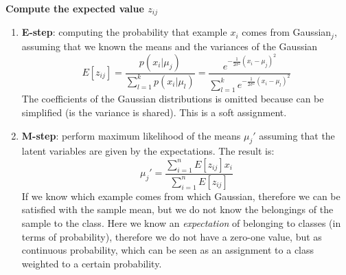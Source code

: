 \textbf{Compute the expected value $z_{ij}$}
\begin{enumerate}
	\item \textbf{E-step}: computing the probability that example $x_{i}$ comes from
		Gaussian$_{j}$, assuming that we known the means and the variances of the Gaussian
		\[
			E[z_{ij}] = \frac{p(x_{i}|\mu_{j})}{\sum_{l=1}^{k}p(x_{i}|\mu_{l})}= \frac{e^{-
			\frac{1}{2 \sigma^ 2} (x_i -\mu_j)^2 }}{ \sum_{l=1}^{k}e^{-
			\frac{1}{2 \sigma^ 2} (x_i - \mu_l)^2 }}
		\]
		The coefficients of the Gaussian distributions is omitted because can be simplified
		(is the variance is shared). This is a soft assignment.

	\item \textbf{M-step}: perform maximum likelihood of the means $\mu_{j}'$ assuming
		that the latent variables are given by the expectations. The result is:
		\[
			\mu_{j}' = \frac{ \sum_{i=1}^{n}E[z_{ij}] x_{i}}{\sum_{i=1}^{n}E[z_{ij}]}
		\]
		If we know which example comes from which Gaussian, therefore we can be
		satisfied with the sample mean, but we do not know the belongings of the sample
		to the class. Here we know an \textit{expectation} of belonging to classes (in
		terms of probability), therefore we do not have a zero-one value, but as continuous
		probability, which can be seen as an assignment to a class weighted to a
		certain probability.
\end{enumerate}

